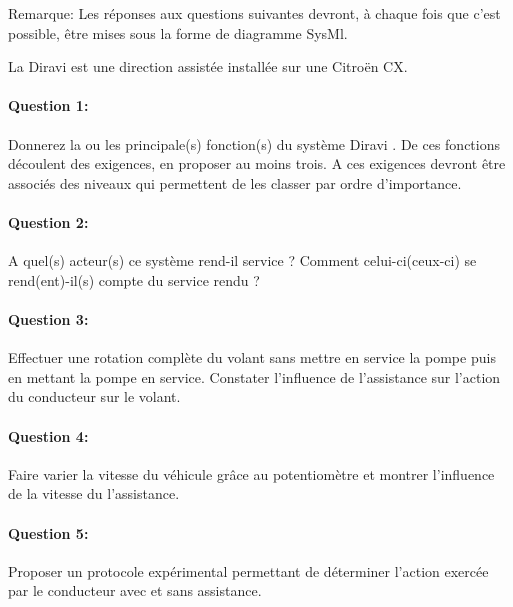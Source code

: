 


Remarque: Les réponses aux questions suivantes devront, à chaque fois que c'est possible, être mises sous la forme de diagramme SysMl.


La Diravi est une direction assistée installée sur une Citroën CX.

\paragraph{Question 1:} Donnerez la ou les principale(s) fonction(s) du système \og Diravi \fg. De ces fonctions découlent des exigences, en proposer au moins trois. A ces exigences devront être associés des niveaux qui permettent de les classer par ordre d'importance.

\paragraph{Question 2:} A quel(s) acteur(s) ce système rend-il service ? Comment celui-ci(ceux-ci) se rend(ent)-il(s) compte du service rendu ?


\paragraph{Question 3:} Effectuer une rotation complète du volant sans mettre en service la pompe puis en mettant la pompe en service. Constater l'influence de l'assistance sur l'action du conducteur sur le volant.

\paragraph{Question 4:} Faire varier la vitesse du véhicule grâce au potentiomètre et montrer l'influence de la vitesse du l'assistance.

\paragraph{Question 5:} Proposer un protocole expérimental permettant de déterminer l'action exercée par le conducteur avec et sans assistance.


